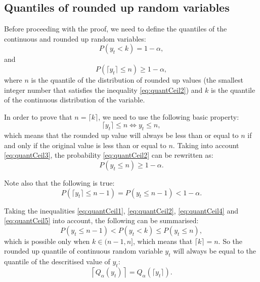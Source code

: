 \documentclass[]{elsarticle} %
\begin{document}
\hypertarget{quantilesceiling}{%
\subsection{Quantiles of rounded up random variables}\label{quantilesceiling}}

Before proceeding with the proof, we need to define the quantiles of the
continuous and rounded up random variables:
\begin{equation} \label{eq:quantCeil1}
    P \left(y_t < k \right) = 1 - \alpha ,
\end{equation} and \begin{equation} \label{eq:quantCeil2}
    P \left(\lceil y_t \rceil \leq n \right) \geq 1 - \alpha ,
\end{equation} where \(n\) is the quantile of the distribution of rounded
up values (the smallest integer number that satisfies the inequality
\eqref{eq:quantCeil2}) and \(k\) is the quantile of the continuous
distribution of the variable.

In order to prove that \(n = \lceil k \rceil\), we need to use the
following basic property: \begin{equation} \label{eq:quantCeil3}
    \lceil y_t \rceil \leq n \iff  y_t \leq n,
\end{equation} which means that the rounded up value will always be less
than or equal to \(n\) if and only if the original value is less than or
equal to \(n\). Taking into account \eqref{eq:quantCeil3}, the probability
\eqref{eq:quantCeil2} can be rewritten as:
\begin{equation} \label{eq:quantCeil4}
    P \left(y_t \leq n \right) \geq 1 - \alpha .
\end{equation}

Note also that the following is true:
\begin{equation} \label{eq:quantCeil5}
    P \left(\lceil y_t \rceil \leq n-1 \right) = P \left(y_t \leq n-1 \right) < 1 - \alpha .
\end{equation}

Taking the inequalities \eqref{eq:quantCeil1}, \eqref{eq:quantCeil2},
\eqref{eq:quantCeil4} and \eqref{eq:quantCeil5} into account, the
following can be summarised: \begin{equation} \label{eq:quantCeil6}
    P \left(y_t \leq n-1 \right) < P \left(y_t < k \right) \leq P \left(y_t \leq n \right) ,
\end{equation} which is possible only when \(k \in (n-1, n]\), which means
that \(\lceil k \rceil = n\). So the rounded up quantile of continuous
random variable \(y_t\) will always be equal to the quantile of the
descritised value of \(y_t\):
\begin{equation} \label{eq:ceilingAndQuantiles1}
    \left \lceil Q_\alpha(y_t) \right \rceil = Q_\alpha \left(\lceil y_t \rceil \right) .
\end{equation}
\end{document}
